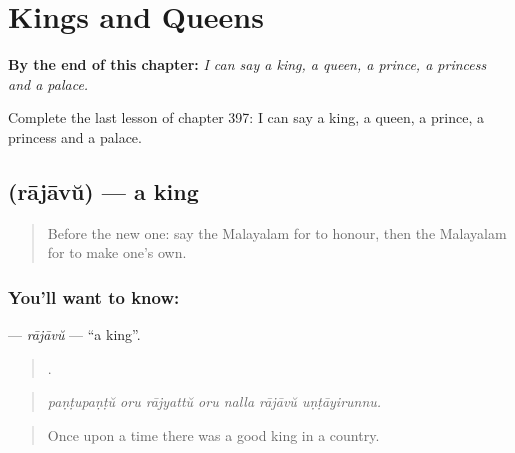 
\chapter{Kings and Queens}
\label{ch:ml-kings-and-queens}

\begin{chapteropening}
\textbf{By the end of this chapter:} \emph{I can say a king, a queen, a prince, a princess and a palace.}

Complete the last lesson of chapter 397: I can say a king, a queen, a prince, a princess and a palace.
\end{chapteropening}

\section[\texorpdfstring{\ml{രാജാവ്} (rājāvŭ)}{രാജാവ് (rājāvŭ)}]{ (rājāvŭ) — a king}

\label{lesson:ML-C397-rajavu}



\begin{quote}
Before the new one: say the Malayalam for to honour, then the Malayalam for to make one's own.
\end{quote}

\subsection*{You'll want to know: }
\textbf{} — \emph{rājāvŭ} — \textquotedblleft{}a king\textquotedblright{}.

\begin{quote}
      .
\end{quote}

\begin{quote}
\emph{paṇṭupaṇṭŭ oru rājyattŭ oru nalla rājāvŭ uṇṭāyirunnu.}
\end{quote}

\begin{quote}
Once upon a time there was a good king in a country.
\end{quote}

